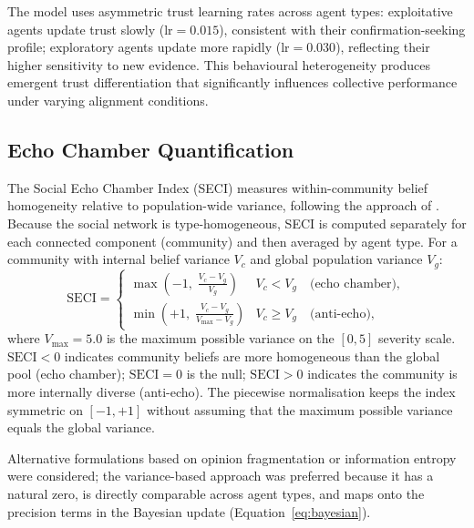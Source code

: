\documentclass[pdflatex,sn-apa]{sn-jnl}%
\begin{document}
The model uses asymmetric trust learning rates across agent types:
exploitative agents update trust slowly ($\mathrm{lr}=0.015$), consistent with
their confirmation-seeking profile; exploratory agents update more rapidly
($\mathrm{lr}=0.030$), reflecting their higher sensitivity to new evidence.
This behavioural heterogeneity produces emergent trust differentiation that
significantly influences collective performance under varying alignment conditions.

\subsection{Echo Chamber Quantification}

The Social Echo Chamber Index (SECI) measures within-community belief homogeneity
relative to population-wide variance, following the approach of
\citet{cinelli2021echo}.
Because the social network is type-homogeneous, SECI is computed separately for
each connected component (community) and then averaged by agent type.
For a community with internal belief variance $V_c$ and global population variance
$V_g$:
%
\begin{equation}
  \mathrm{SECI} =
  \begin{cases}
    \displaystyle\max\!\left(-1,\;\frac{V_c - V_g}{V_g}\right)
      & V_c < V_g \quad\text{(echo chamber)}, \\[8pt]
    \displaystyle\min\!\left(+1,\;\frac{V_c - V_g}{V_{\max} - V_g}\right)
      & V_c \geq V_g \quad\text{(anti-echo)},
  \end{cases}
  \label{eq:seci}
\end{equation}
%
where $V_{\max}=5.0$ is the maximum possible variance on the $[0,5]$ severity
scale.
$\mathrm{SECI}<0$ indicates community beliefs are more homogeneous than the global
pool (echo chamber); $\mathrm{SECI}=0$ is the null; $\mathrm{SECI}>0$ indicates
the community is more internally diverse (anti-echo).
The piecewise normalisation keeps the index symmetric on $[-1,+1]$ without
assuming that the maximum possible variance equals the global variance.

Alternative formulations based on opinion fragmentation \citep{Bail2018} or
information entropy \citep{Sasahara2021} were considered; the variance-based
approach was preferred because it has a natural zero, is directly comparable across
agent types, and maps onto the precision terms in the Bayesian update
(Equation~\ref{eq:bayesian}).
\end{document}

